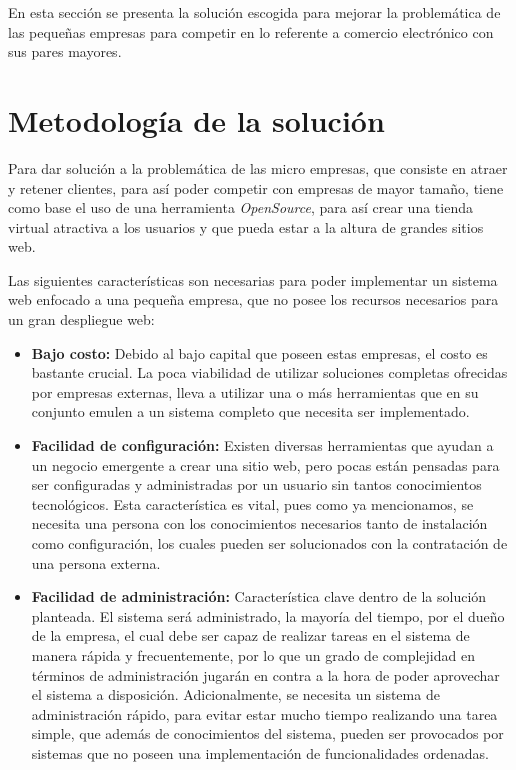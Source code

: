 En esta sección se presenta la solución escogida
para mejorar la problemática de las pequeñas empresas para competir en lo
referente a comercio electrónico con sus pares mayores.

\section{Metodología de la solución}
\label{sec:4.1}

Para dar solución a la problemática de las micro empresas,
que consiste en atraer y retener clientes, para así poder competir
con empresas de mayor tamaño, tiene como base el uso de una herramienta
\emph{OpenSource}, para así crear una tienda virtual atractiva a los usuarios
y que pueda estar a la altura de grandes sitios web.

Las siguientes características son necesarias para poder implementar un sistema
web enfocado a una pequeña empresa, que no posee los recursos necesarios
para un gran despliegue web:

\begin{itemize}
    \item {\bf Bajo costo:}
        Debido al bajo capital que poseen estas empresas, el costo
        es bastante crucial.
        La poca viabilidad de utilizar soluciones completas ofrecidas
        por empresas externas, lleva a utilizar una o más herramientas
        que en su conjunto emulen a un sistema completo que necesita ser
        implementado.

    \item {\bf Facilidad de configuración:}
        Existen diversas herramientas que ayudan a un negocio emergente a crear
        una sitio web, pero pocas están pensadas para ser configuradas y administradas
	por un usuario sin tantos conocimientos tecnológicos.
        Esta característica es vital, pues como ya mencionamos,
        se necesita una persona con los conocimientos necesarios tanto
        de instalación como configuración, los cuales pueden ser solucionados
        con la contratación de una persona externa.

    \item {\bf Facilidad de administración:}
        Característica clave dentro de la solución planteada.
        El sistema será administrado, la mayoría del tiempo, por el dueño de la
        empresa, el cual debe ser capaz de realizar tareas en el sistema
        de manera rápida y frecuentemente, por lo que un grado
        de complejidad en términos de administración jugarán en contra
        a la hora de poder aprovechar el sistema a disposición.
        Adicionalmente, se necesita un sistema de administración rápido,
        para evitar estar mucho tiempo realizando una tarea simple, que
        además de conocimientos del sistema, pueden ser provocados por sistemas
        que no poseen una implementación de funcionalidades ordenadas.

\end{itemize}

